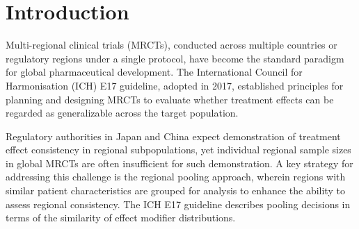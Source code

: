 \documentclass[AMA,Times1COL]{WileyNJDv5}
\begin{document}


\maketitle

\renewcommand\thefootnote{}

\renewcommand\thefootnote{\fnsymbol{footnote}}
\setcounter{footnote}{1}

\section{Introduction}\label{sec:intro}

Multi-regional clinical trials (MRCTs), conducted across multiple countries or regulatory regions under a single protocol, have become the standard paradigm for global pharmaceutical development.\cite{chen2010,quan2010} The International Council for Harmonisation (ICH) E17 guideline, adopted in 2017, established principles for planning and designing MRCTs to evaluate whether treatment effects can be regarded as generalizable across the target population.\cite{iche17}

Regulatory authorities in Japan and China expect demonstration of treatment effect consistency in regional subpopulations,\cite{matsushima2024,song2025} yet individual regional sample sizes in global MRCTs are often insufficient for such demonstration. A key strategy for addressing this challenge is the regional pooling approach, wherein regions with similar patient characteristics are grouped for analysis to enhance the ability to assess regional consistency.\cite{iche17} The ICH E17 guideline describes pooling decisions in terms of the similarity of effect modifier distributions.\cite{iche17}
\end{document}
